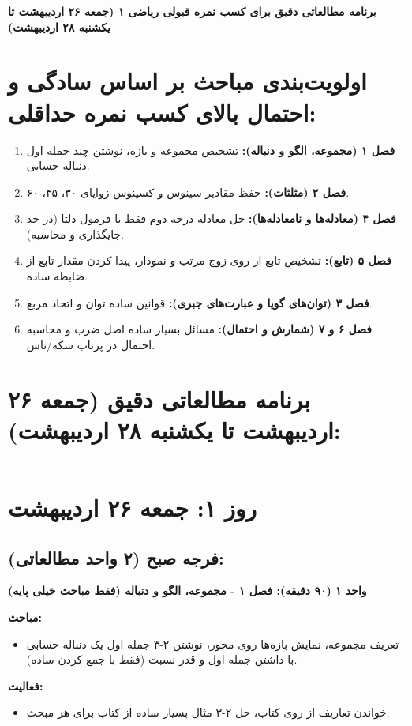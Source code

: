 \documentclass[12pt,a4paper]{article}
\newcommand{\studyunit}[1]{\par\medskip\noindent\textbf{#1}\par\nopagebreak}
\newcommand{\topics}{\par\medskip\noindent\textbf{مباحث:}\begin{itemize}[nosep,after=\vspace{-0.5\baselineskip}]}
\newcommand{\activities}{\par\medskip\noindent\textbf{فعالیت:}\begin{itemize}[nosep,after=\vspace{-0.5\baselineskip}]}
\begin{document}
\begin{center}
\Large\textbf{برنامه مطالعاتی دقیق برای کسب نمره قبولی ریاضی ۱ (جمعه ۲۶ اردیبهشت تا یکشنبه ۲۸ اردیبهشت)}
\end{center}
\hrulefill
\vspace{1em}

\section*{اولویت‌بندی مباحث بر اساس سادگی و احتمال بالای کسب نمره حداقلی:}
\begin{enumerate}[label=\arabic*., itemsep=0.2em, topsep=0.3em]
    \item \textbf{فصل ۱ (مجموعه، الگو و دنباله):} تشخیص مجموعه و بازه، نوشتن چند جمله اول دنباله حسابی.
    \item \textbf{فصل ۲ (مثلثات):} حفظ مقادیر سینوس و کسینوس زوایای ۳۰، ۴۵، ۶۰.
    \item \textbf{فصل ۴ (معادله‌ها و نامعادله‌ها):} حل معادله درجه دوم فقط با فرمول دلتا (در حد جایگذاری و محاسبه).
    \item \textbf{فصل ۵ (تابع):} تشخیص تابع از روی زوج مرتب و نمودار، پیدا کردن مقدار تابع از ضابطه ساده.
    \item \textbf{فصل ۳ (توان‌های گویا و عبارت‌های جبری):} قوانین ساده توان و اتحاد مربع.
    \item \textbf{فصل ۶ و ۷ (شمارش و احتمال):} مسائل بسیار ساده اصل ضرب و محاسبه احتمال در پرتاب سکه/تاس.
\end{enumerate}
\vspace{1em}

\section*{برنامه مطالعاتی دقیق (جمعه ۲۶ اردیبهشت تا یکشنبه ۲۸ اردیبهشت):}
\rule{\linewidth}{0.4pt}\vspace{1em}

\section*{روز ۱: جمعه ۲۶ اردیبهشت}

\subsection*{فرجه صبح (۲ واحد مطالعاتی):}
    \studyunit{واحد ۱ (۹۰ دقیقه): فصل ۱ - مجموعه، الگو و دنباله (فقط مباحث خیلی پایه)}
        \topics
            \item تعریف مجموعه، نمایش بازه‌ها روی محور، نوشتن ۲-۳ جمله اول یک دنباله حسابی با داشتن جمله اول و قدر نسبت (فقط با جمع کردن ساده).
        \end{itemize}
        \activities
            \item خواندن تعاریف از روی کتاب، حل ۲-۳ مثال بسیار ساده از کتاب برای هر مبحث.
        \end{itemize}
\end{document}
